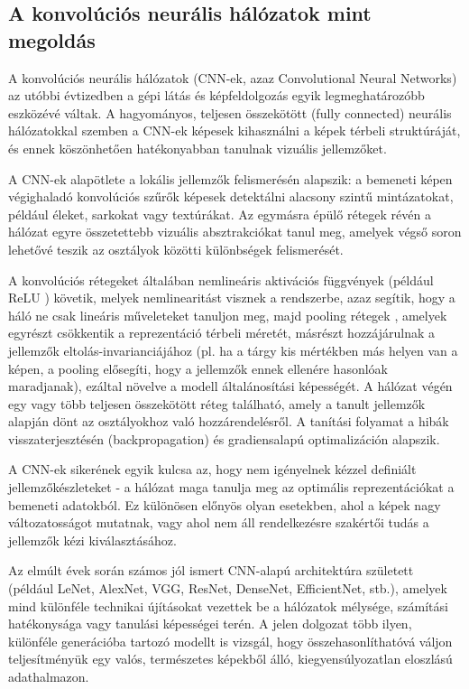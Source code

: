         \subsection{A konvolúciós neurális hálózatok mint megoldás}
            A konvolúciós neurális hálózatok (CNN-ek, azaz Convolutional Neural Networks) az utóbbi évtizedben a gépi látás és képfeldolgozás egyik legmeghatározóbb eszközévé váltak. A hagyományos, teljesen összekötött (fully connected) neurális hálózatokkal szemben a CNN-ek képesek kihasználni a képek térbeli struktúráját, és ennek köszönhetően hatékonyabban tanulnak vizuális jellemzőket.

            A CNN-ek alapötlete a lokális jellemzők felismerésén alapszik: a bemeneti képen végighaladó konvolúciós szűrők képesek detektálni alacsony szintű mintázatokat, például éleket, sarkokat vagy textúrákat. Az egymásra épülő rétegek révén a hálózat egyre összetettebb vizuális absztrakciókat tanul meg, amelyek végső soron lehetővé teszik az osztályok közötti különbségek felismerését.
            
            A konvolúciós rétegeket általában nemlineáris aktivációs függvények (például ReLU \cite{article_GELU}) követik, melyek nemlinearitást visznek a rendszerbe, azaz segítik, hogy a háló ne csak lineáris műveleteket tanuljon meg, majd pooling rétegek \cite{article_LayerNorm} \cite{article_dropaut}, amelyek egyrészt csökkentik a reprezentáció térbeli méretét, másrészt hozzájárulnak a jellemzők eltolás-invarianciájához (pl. ha a tárgy kis mértékben más helyen van a képen, a pooling elősegíti, hogy a jellemzők ennek ellenére hasonlóak maradjanak), ezáltal növelve a modell általánosítási képességét. A hálózat végén egy vagy több teljesen összekötött réteg található, amely a tanult jellemzők alapján dönt az osztályokhoz való hozzárendelésről. A tanítási folyamat a hibák visszaterjesztésén (backpropagation) és gradiensalapú optimalizáción alapszik.
            
            A CNN-ek sikerének egyik kulcsa az, hogy nem igényelnek kézzel definiált jellemzőkészleteket - a hálózat maga tanulja meg az optimális reprezentációkat a bemeneti adatokból. Ez különösen előnyös olyan esetekben, ahol a képek nagy változatosságot mutatnak, vagy ahol nem áll rendelkezésre szakértői tudás a jellemzők kézi kiválasztásához.
            
            Az elmúlt évek során számos jól ismert CNN-alapú architektúra született (például LeNet, AlexNet, VGG, ResNet, DenseNet, EfficientNet, stb.), amelyek mind különféle technikai újításokat vezettek be a hálózatok mélysége, számítási hatékonysága vagy tanulási képességei terén. A jelen dolgozat több ilyen, különféle generációba tartozó modellt is vizsgál, hogy összehasonlíthatóvá váljon teljesítményük egy valós, természetes képekből álló, kiegyensúlyozatlan eloszlású adathalmazon. 


